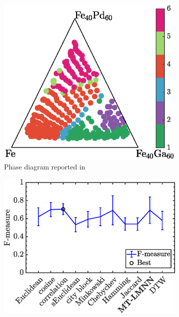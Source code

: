 \begin{figure}[h]
    \centering
    \begin{subfigure}[b]{0.475\textwidth} 
        \centering 
        \includegraphics[width=1\textwidth]{Chapter-2/figs/fig5a.eps}
        \caption{Phase diagram reported in \cite{long2007rapid}}
        \label{refFePdGa}
    \end{subfigure}
    \quad
        \begin{subfigure}[b]{0.475\textwidth} 
        \centering 
        \includegraphics[width=1\textwidth]{Chapter-2/figs/fig5b.eps}

\end{subfigure}
\end{figure}
